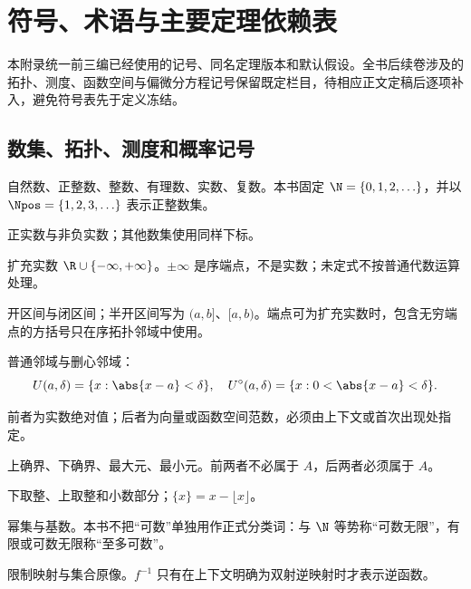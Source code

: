 \chapter{符号、术语与主要定理依赖表}
\label{app:notation-dependencies}
\label{chap:appendix-notation-dependencies}

\begin{chapterguide}
本附录统一前三编已经使用的记号、同名定理版本和默认假设。全书后续卷涉及的拓扑、测度、函数空间与偏微分方程记号保留既定栏目，待相应正文定稿后逐项补入，避免符号表先于定义冻结。
\end{chapterguide}

\section{数集、拓扑、测度和概率记号}

\begin{description}[style=nextline,leftmargin=4.2em]
 \item[\(\N,\Npos,\Z,\Q,\R,\C\)]
 自然数、正整数、整数、有理数、实数、复数。本书固定 \(\N=\{0,1,2,\ldots\}\)，并以 \(\Npos=\{1,2,3,\ldots\}\) 表示正整数集。
 \item[\(\R_{>0},\R_{\ge0}\)]
 正实数与非负实数；其他数集使用同样下标。
 \item[\(\overline{\R}\)]
 扩充实数 \(\R\cup\{-\infty,+\infty\}\)。\(\pm\infty\) 是序端点，不是实数；未定式不按普通代数运算处理。
 \item[{\((a,b),[a,b]\)}]
 开区间与闭区间；半开区间写为 \((a,b]\)、\([a,b)\)。端点可为扩充实数时，包含无穷端点的方括号只在序拓扑邻域中使用。
 \item[\(U(a,\delta),U^\circ(a,\delta)\)]
 普通邻域与删心邻域：
 \[
  U(a,\delta)=\{x:\abs{x-a}<\delta\},\quad
  U^\circ(a,\delta)=\{x:0<\abs{x-a}<\delta\}.
 \]
 \item[\(\abs{x},\norm{x}\)]
 前者为实数绝对值；后者为向量或函数空间范数，必须由上下文或首次出现处指定。
 \item[\(\sup A,\inf A,\max A,\min A\)]
 上确界、下确界、最大元、最小元。前两者不必属于 \(A\)，后两者必须属于 \(A\)。
 \item[\(\lfloor x\rfloor,\lceil x\rceil,\{x\}\)]
 下取整、上取整和小数部分；\(\{x\}=x-\lfloor x\rfloor\)。
 \item[\(\mathcal P(X),\lvert X\rvert\)]
 幂集与基数。本书不把“可数”单独用作正式分类词：与 \(\N\) 等势称“可数无限”，有限或可数无限称“至多可数”。
 \item[\(f|_E,f^{-1}(A)\)]
 限制映射与集合原像。\(f^{-1}\) 只有在上下文明确为双射逆映射时才表示逆函数。
\end{description}

